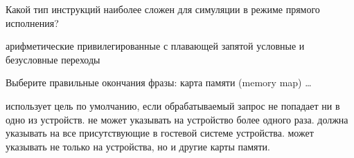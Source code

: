 \documentclass[a4paper, addpoints]{exam}
\begin{document}
\begin{questions}



\question[1] Какой тип инструкций наиболее сложен для симуляции в режиме прямого исполнения?
\begin{choices}
    \choice арифметические
    \correctchoice привилегированные
    \choice с плавающей запятой
    \choice условные и безусловные переходы
\end{choices}

% 


\question[1] Выберите правильные окончания фразы: карта памяти (memory map) \dots
\begin{choices}
 	\correctchoice использует цель по умолчанию, если обрабатываемый запрос не попадает ни в одно из устройств.
 	\choice не может указывать на устройство более одного раза.
 	\choice должна указывать на все присутствующие в гостевой системе устройства.
 	\correctchoice может указывать не только на устройства, но и другие карты памяти.
\end{choices}


    

\end{questions}
\end{document}
